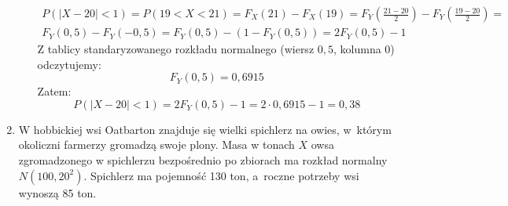\documentclass[twoside]{mwart}
\newcommand{\ans}[1]{}
\newenvironment{ansenv}{\comment}{\endcomment}
\newenvironment{ansenv}{\paragraph{Odpowiedź:}}{}
\newcommand{\ans}[1]{\begin{ansenv}#1\end{ansenv}}
\begin{document}
\begin{enumerate}
\begin{enumerate}
\begin{ansenv}
	\begin{gather*}
	 P(\left|X-20\right|<1) = P(19<X<21) = F_X(21) - F_X(19) = F_Y\left(\frac{21-20}{2}\right)-F_Y\left(\frac{19-20}{2}\right) = \\ 
	 F_Y(0{,}5) - F_Y(-0{,}5) = F_Y(0{,}5) - (1-F_Y(0{,}5)) = 2F_Y(0{,}5) - 1
	\end{gather*}
	Z tablicy standaryzowanego rozkładu normalnego (wiersz $0{,}5$, kolumna $0$) odczytujemy:
	\[ F_Y(0{,}5)=0{,}6915 \]
	Zatem:
	\[ P(\left|X-20\right|<1) = 2F_Y(0{,}5) - 1 = 2\cdot0{,}6915-1=0{,}38 \]
\end{ansenv}
\end{enumerate}
%
\item W hobbickiej wsi Oatbarton znajduje się wielki spichlerz na owies, w~którym okoliczni farmerzy gromadzą swoje plony.
Masa w tonach $X$ owsa zgromadzonego w spichlerzu bezpośrednio po zbiorach ma rozkład normalny $N(100, 20^2)$.
Spichlerz ma pojemność 130 ton, a~roczne potrzeby wsi wynoszą 85 ton.


\end{enumerate}
\end{document}
